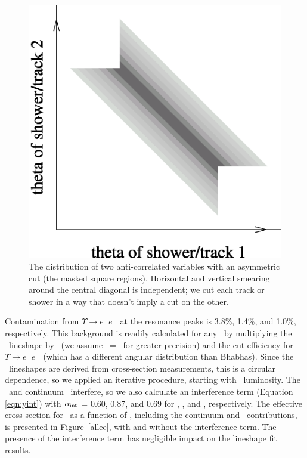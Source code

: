 \documentclass{cornell}
\begin{document}
\begin{figure}[p]
  \begin{center}
    \includegraphics[width=0.4\linewidth]{asymmetriccartoon}
  \end{center}
  \caption[Distribution provided by an asymmetric
  cut]{\label{asymmetriccartoon} The distribution of two
  anti-correlated variables with an asymmetric cut (the masked square
  regions).  Horizontal and vertical smearing around the central
  diagonal is independent; we cut each track or shower in a way that
  doesn't imply a cut on the other.}
\end{figure}

Contamination from $\Upsilon \to e^+e^-$ at the resonance peaks is
3.8\%, 1.4\%, and 1.0\%, respectively.  This background is readily
calculated for any \ecm\ by multiplying the \ups\ lineshape by \bee\
(we assume \bee\ = \bmm\ for greater precision) and the cut efficiency
for $\Upsilon \to e^+e^-$ (which has a different angular distribution
than Bhabhas).  Since the \ups\ lineshapes are derived from
cross-section measurements, this is a circular dependence, so we
applied an iterative procedure, starting with \gamgam\ luminosity.
The \ups\ and continuum \ee\ interfere, so we also calculate an
interference term (Equation \ref{eqn:yint}) with $\alpha_{\mbox{\scriptsize int}}$ =
0.60, 0.87, and 0.69 for \us, \uss, and \usss, respectively.  The
effective cross-section for \ee\ as a function of \ecm, including the
continuum and \ups\ contributions, is presented in Figure~\ref{allee},
with and without the interference term.  The presence of the
interference term has negligible impact on the lineshape fit results.
\end{document}
